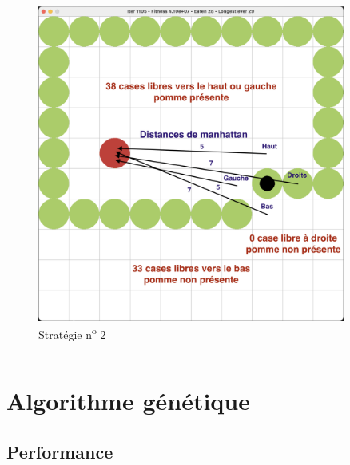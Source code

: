 \documentclass[10pt]{beamer}
\begin{document}
\begin{frame}
\begin{columns}[T]
\begin{column}{0.40\textwidth}
\begin{figure}
\vspace{-0.6cm}
\includegraphics[width=0.9\textwidth]{snake_vision_illustration.png}
\caption*{\tiny Stratégie n\textsuperscript{o} 2}
\end{figure}

\end{column}
\end{columns}
\end{frame}

\section{Algorithme génétique}

\subsection{Performance}
\end{document}
